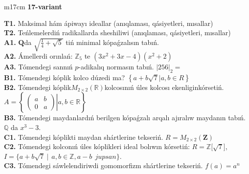 \documentclass{article}
\begin{document}
\begin{tabular}{m{17cm}}
\textbf{17-variant}
\newline

\textbf{T1.} Maksimal hám ápiwayı ideallar (anıqlaması, qásiyetleri, mısallar) \\
\textbf{T2.} Teńlemelerdiń radikallarda sheshiliwi (anıqlaması, qásiyetleri, mısallar) \\
\textbf{A1.} \(\mathbf{Q}\)da \(\sqrt{\frac{1}{4} + \sqrt{5}}\) tiń minimal kópaǵzalısın tabıń. \\
\textbf{A2.} Ámellerdi orınlań: \(\mathbb{Z}_{5}\) te \(\left( 3x^{2} + 3x - 4 \right)\left( x^{2} + 2 \right)\) \\
\textbf{A3.} Tómendegi sannıń \(p\)-adikalıq normasın tabıń. \(|256|_{2} =\) \\
\textbf{B1.} Tómendegi kóplik kolco dúzedi ma? \(\left\{ a + b\sqrt{7}|a,b \in R \right\}\) \\
\textbf{B2.} Tómendegi kóplik\(M_{2 \times 2}\left( \mathbb{R} \right)\)kolcosınıń úles kolcosı ekenliginkórsetiń. \(A = \left\{ \left. \ \begin{pmatrix}
a & b \\
0 & a
\end{pmatrix} \right|a,b\mathbb{\in R} \right\}\) \\
\textbf{B3.} Tómendegi maydanlardıń berilgen kópaǵzalı arqalı ajıralıw maydanın tabıń. \(\mathbb{Q}\) da \(x^{3} - 3\). \\
\textbf{C1.} Tómendegi kóplikti maydan shártlerine tekseriń. \(R = M_{2 \times 2}\left( \mathbf{Z} \right)\) \\
\textbf{C2.} Tómendegi kolconıń úles kóplikleri ideal bolıwın kórsetiń:
\(R\mathbb{= Z\lbrack}\sqrt{7}\rbrack\), \(I = \{ a + b\sqrt{7}\ |\ \ a,b \in \mathbb{Z,}a - b\ \ jupsan\}\). \\
\textbf{C3.} Tómendegi sáwlelendiriwdi gomomorfizm shártlerine tekseriń. \(f(a) = a^{n}\) \\

\end{tabular}
\vspace{1cm}
\end{document}
